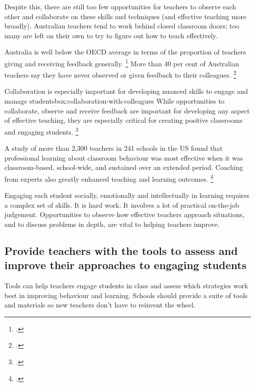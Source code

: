\documentclass[FrontPage]{grattan}
\begin{document}
Despite this, there are still too few opportunities for teachers to observe each other and collaborate on these skills and techniques (and effective teaching more broadly). Australian teachers tend to work behind closed classroom doors; too many are left on their own to try to figure out how to teach effectively.

Australia is well below the OECD average in terms of the proportion of teachers giving and receiving feedback generally.%
    \footcite[][359, 394]{OECD2014TALIS2013ResultsTeachingLearning}
More than 40 per cent of Australian teachers say they have never observed or given feedback to their colleagues.%
    \footcite[][128]{Freeman2014AustralianTeachersLearning}

\begin{smallbox}{Collaboration is especially important for developing nuanced skills to engage and manage students}{box:collaboration-with-colleagues}
While opportunities to collaborate, observe and receive feedback are important for developing any aspect of effective teaching, they are especially critical for creating positive classrooms and engaging students.%
    \footcites{Epstein2008ReducingBehaviorProblems}{Hough2011CharacteristicsEffectiveProfessional} 
 
A study of more than 2,300 teachers in 241 schools in the US found that professional learning about classroom behaviour was most effective when it was classroom-based, school-wide, and sustained over an extended period. Coaching from experts also greatly enhanced teaching and learning outcomes.%
    \footcites{Hough2011CharacteristicsEffectiveProfessional}
 
Engaging each student socially, emotionally and intellectually in learning requires a complex set of skills. It is hard work. It involves a lot of practical on-the-job judgement. Opportunities to observe how effective teachers approach situations, and to discuss problems in depth, are vital to helping teachers improve.
\end{smallbox}
%

\subsection{Provide teachers with the tools to assess and improve their approaches to engaging students}\label{subsubsec:provide-teachers-with-tools}
Tools can help teachers engage students in class and assess which strategies work best in improving behaviour and learning. Schools should provide a suite of tools and materials so new teachers don’t have to reinvent the wheel. 
 
\end{document}
